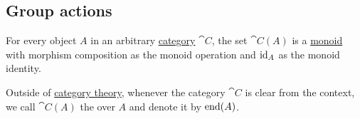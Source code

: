 \subsection{Group actions}\label{subsec:group_actions}

\begin{definition}\label{def:endomorphism_monoid}
  For every object \( A \) in an arbitrary \hyperref[def:category]{category} \( \cat{C} \), the set \( \cat{C}(A) \) is a \hyperref[def:unital_magma/monoid]{monoid} with morphism composition as the monoid operation and \( \operatorname{id}_A \) as the monoid identity.

  Outside of \hyperref[sec:category_theory]{category theory}, whenever the category \( \cat{C} \) is clear from the context, we call \( \cat{C}(A) \) the  over \( A \) and denote it by \( \operatorname{end}(A) \).
\end{definition}

